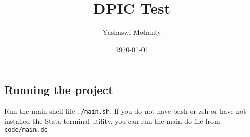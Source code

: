 \documentclass{article}
\title{DPIC Test}
\author{Yashaswi Mohanty}
\date{\today}
\begin{document}
\maketitle

\subsection*{Running the project}
Run the main shell file \verb|./main.sh|. If you do not have bash or zsh or have not installed the Stata terminal utility, you can run the main do file from \verb|code/main.do|
\end{document}
